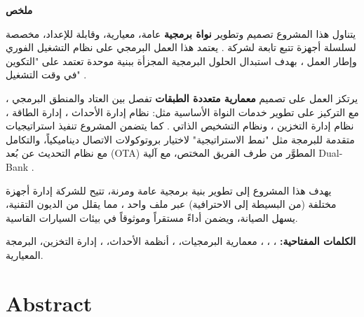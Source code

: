 \newpage
{}  %
\begin{otherlanguage}{arabic}

\begin{center}
\textbf{\large ملخص}
\end{center}

\vspace{0.3cm}
\setlength{\parskip}{0.3cm}
\setlength{\parindent}{1cm}

يتناول هذا المشروع تصميم وتطوير \textbf{نواة برمجية}  عامة، معيارية، وقابلة للإعداد، مخصصة لسلسلة أجهزة تتبع  تابعة لشركة . يعتمد هذا العمل البرمجي على نظام التشغيل الفوري  وإطار العمل ، بهدف استبدال الحلول البرمجية المجزأة ببنية موحدة تعتمد على "التكوين في وقت التشغيل" .

يرتكز العمل على تصميم \textbf{معمارية متعددة الطبقات}  تفصل بين العتاد  والمنطق البرمجي ، مع التركيز على تطوير خدمات النواة الأساسية مثل: نظام إدارة الأحداث ، إدارة الطاقة ، نظام إدارة التخزين ، ونظام التشخيص الذاتي . كما يتضمن المشروع تنفيذ استراتيجيات متقدمة للبرمجة مثل "نمط الاستراتيجية"  لاختيار بروتوكولات الاتصال ديناميكياً، والتكامل مع نظام التحديث عن بُعد (OTA) المطوَّر من طرف الفريق المختص، مع آلية Dual-Bank .

يهدف هذا المشروع إلى تطوير بنية برمجية عامة ومرنة، تتيح للشركة إدارة أجهزة مختلفة (من البسيطة إلى الاحترافية) عبر ملف  واحد ، مما يقلل من الديون التقنية، يسهل الصيانة، ويضمن أداءً مستقراً وموثوقاً في بيئات السيارات القاسية.

\vspace{0.3cm}
\noindent\textbf{الكلمات المفتاحية:}
،
،
،
معمارية البرمجيات،
،
أنظمة الأحداث،
،
إدارة التخزين،
البرمجة المعيارية.

\end{otherlanguage}
\newpage

\chapter*{Abstract}

